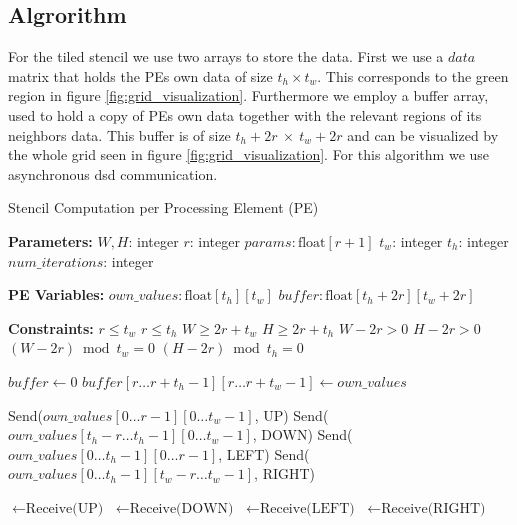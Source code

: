 \documentclass{article}
\begin{document}
\subsection{Algrorithm}
For the tiled stencil we use two arrays to store the data. First we use a $data$ matrix that holds the PEs own data of size $t_h\times t_w$. This corresponds to the green region in figure \ref{fig:grid_visualization}. Furthermore we employ a buffer array, used to hold a copy of PEs own data together with the relevant regions of its neighbors data. This buffer is of size $t_h+2r~\times~t_w+2r$ and can be visualized by the whole grid seen in figure \ref{fig:grid_visualization}.
For this algorithm we use asynchronous dsd communication.
\begin{algorithm}
\caption{Stencil Computation per Processing Element (PE)}
\begin{algorithmic}[1]
\Statex \textbf{Parameters:}
\State $W, H$: integer 
\State $r$: integer 
\State $params: \text{float}[r+1]$ 
\State $t_w$: integer 
\State $t_h$: integer 
\State $num\_iterations$: integer

\Statex
\Statex \textbf{PE Variables:}
\State $own\_values: \text{float}[t_h][t_w]$
\State $buffer: \text{float}[t_h + 2r][t_w + 2r]$

\Statex
\Statex \textbf{Constraints:}
\State $r \le t_w$
\State $r \le t_h$
\State $W \ge 2r + t_w$
\State $H \ge 2r + t_h$
\State $W - 2r > 0$
\State $H - 2r > 0$
\State $(W - 2r) \bmod t_w = 0$
\State $(H - 2r) \bmod t_h = 0$

\Statex
{}
    \State $buffer\gets 0$
        \State $buffer[r \dots r+t_h-1][r \dots r+t_w-1] \gets own\_values$
        
        \State Send($own\_values[0 \dots r-1][0 \dots t_w-1]$, UP)
        \State Send($own\_values[t_h-r \dots t_h-1][0 \dots t_w-1]$, DOWN)
        \State Send($own\_values[0 \dots t_h-1][0 \dots r-1]$, LEFT)
        \State Send($own\_values[0 \dots t_h-1][t_w-r \dots t_w-1]$, RIGHT)
        
        \State {} $\gets \text{Receive(UP)}$
        \State {} $\gets \text{Receive(DOWN)}$
        \State {} $\gets \text{Receive(LEFT)}$
        \State {} $\gets \text{Receive(RIGHT)}$
        

\end{algorithmic}
\end{algorithm}
\end{document}
